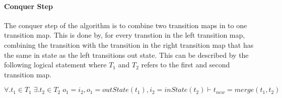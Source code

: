 \paragraph{Conquer Step}
The conquer step of the algorithm is to combine two transition maps in to one
transition map. This is done by, for every transtion in the left transition map, combining
the transition with the transition in the right transition map that has the same in state as the
left transitions out state. This can be described by the following logical statement where $T_1$ and $T_2$ refers to the first and second transition map.
\begin{center}
$\forall.t_1\in T_1\;\exists.t_2\in T_2\;o_1=i_2,o_1=outState(t_1),i_2=inState(t_2)
\vdash t_{new}=merge(t_1,t_2)$
\end{center}

